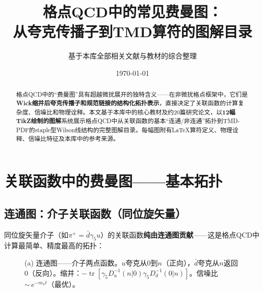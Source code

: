 \documentclass[12pt,a4paper]{ctexart}
\title{\heiti 格点QCD中的常见费曼图：\\
从夸克传播子到TMD算符的图解目录}
\author{基于本库全部相关文献与教材的综合整理}
\date{\today}
\begin{document}
\maketitle

\begin{abstract}
\noindent
格点QCD中的``费曼图''具有超越微扰展开的独特含义——在非微扰格点框架中，它们是\textbf{Wick缩并后夸克传播子和规范链接的结构化拓扑表示}，直接决定了关联函数的计算复杂度、信噪比和物理诠释。本文基于本库中的核心教材及约20篇研究论文，以\textbf{12幅TikZ绘制的图解}系统展示格点QCD中从关联函数的基本``连通/非连通''拓扑到TMD-PDF的staple型Wilson线结构的完整图解目录。每幅图附有LaTeX算符定义、物理诠释、信噪比特征及本库中的参考来源。
\end{abstract}

\tableofcontents
\newpage

\section{关联函数中的费曼图——基本拓扑}

\subsection{连通图：介子关联函数（同位旋矢量）}

同位旋矢量介子（如$\pi^+ = \bar d \gamma_5 u$）的关联函数\textbf{纯由连通图贡献}——这是格点QCD中计算最简单、精度最高的拓扑：

\begin{figure}[H]
\centering
{}
\caption{(a) 连通图——介子两点函数。$u$夸克从$0$到$n$（正向），$\bar d$夸克从$n$返回$0$（反向）。缩并：$-\operatorname{tr}[\gamma_5 D_u^{-1}(n|0)\gamma_5 D_d^{-1}(0|n)]$。信噪比 ${\sim}\,e^{-m_\pi t}$（最优）。}
\label{fig:connected_meson}
\end{figure}
\end{document}
